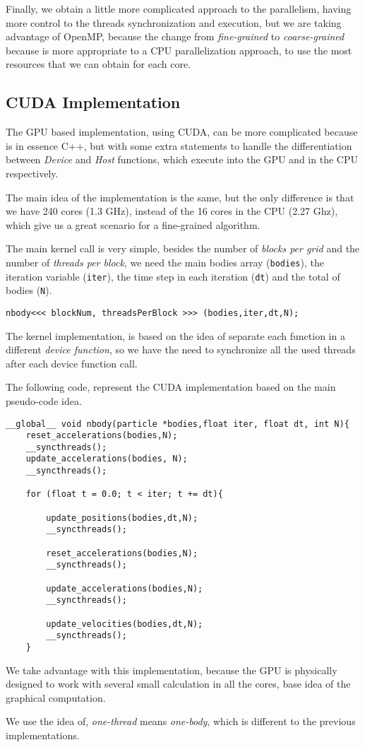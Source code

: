 Finally, we obtain a little more complicated approach to the parallelism,
having more control to the threads synchronization and execution,
but we are taking advantage of OpenMP, because the change from
\emph{fine-grained} to \emph{coarse-grained} because is more appropriate
to a CPU parallelization approach, to use the most resources that
we can obtain for each core.

\subsection{CUDA Implementation}

The GPU based implementation, using CUDA,
can be more complicated because is in essence C++,
but with some extra statements to handle the
differentiation between \emph{Device} and \emph{Host} functions,
which execute into the GPU and in the CPU respectively.

The main idea of the implementation is the same,
but the only difference is that we have 240 cores (1.3 GHz),
instead of the 16 cores in the CPU (2.27 Ghz),
which give us a great scenario for a fine-grained algorithm.

The main kernel call is very simple,
besides the number of \emph{blocks per grid}
and the number of \emph{threads per block},
we need the main bodies array (\texttt{bodies}), the iteration variable (\texttt{iter}),
the time step in each iteration (\texttt{dt}) and the total of bodies (\texttt{N}). 

\begin{lstlisting}[style=C]
    nbody<<< blockNum, threadsPerBlock >>> (bodies,iter,dt,N);
\end{lstlisting}

The kernel implementation,
is based on the idea of separate each function
in a different \emph{device function},
so we have the need to synchronize all the used
threads after each device function call.

The following code, represent the CUDA implementation
based on the main pseudo-code idea.

\begin{lstlisting}[style=C]
__global__ void nbody(particle *bodies,float iter, float dt, int N){
    reset_accelerations(bodies,N);
    __syncthreads();
    update_accelerations(bodies, N);
    __syncthreads();
    
    for (float t = 0.0; t < iter; t += dt){
    
        update_positions(bodies,dt,N);
        __syncthreads();

        reset_accelerations(bodies,N);
        __syncthreads();

        update_accelerations(bodies,N);
        __syncthreads();
    
        update_velocities(bodies,dt,N);
        __syncthreads();
    }
\end{lstlisting}

We take advantage with this implementation,
because the GPU is physically designed
to work with several small calculation
in all the cores, base idea of the graphical
computation.

We use the idea of, \emph{one-thread}
means \emph{one-body}, which is different
to the previous implementations.
